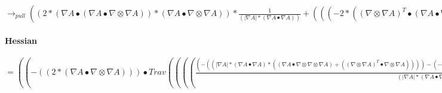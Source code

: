 \documentclass{article}
\begin{document}
\newline $\rightarrow_{pull}((2*( \nabla A \bullet ( \nabla A \bullet  \nabla  \otimes  \nabla A))*( \nabla A \bullet  \nabla  \otimes  \nabla A))* \frac{1}{(| \nabla A|*( \nabla A \bullet  \nabla A))}+(((-2*(( \nabla  \otimes  \nabla A)^T \bullet ( \nabla A \bullet  \nabla  \otimes  \nabla A)))+(-2*( \nabla A \bullet ( \nabla A \bullet  \nabla  \otimes  \nabla  \otimes  \nabla A))))+(-2*( \nabla A \bullet (( \nabla  \otimes  \nabla A)^T \bullet  \nabla  \otimes  \nabla A))))* \frac{1}{| \nabla A|})$

\paragraph{Hessian}
$= ((-((2*( \nabla A \bullet  \nabla  \otimes  \nabla A))) \bullet Trav(((( \frac{(-((| \nabla A|*( \nabla A \bullet  \nabla A)*(( \nabla A \bullet  \nabla  \otimes  \nabla  \otimes  \nabla A)+(( \nabla  \otimes  \nabla A)^T \bullet  \nabla  \otimes  \nabla A))))-(-(((((2*| \nabla A|*( \nabla A \bullet  \nabla  \otimes  \nabla A))+(( \nabla A \bullet  \nabla A)* \frac{( \nabla A \bullet  \nabla  \otimes  \nabla A)}{| \nabla A|}))*( \nabla A \bullet  \nabla  \otimes  \nabla A)))))^T)}{(| \nabla A|*( \nabla A \bullet  \nabla A)*| \nabla A|*( \nabla A \bullet  \nabla A))}* \nabla A))+Trav((( \nabla  \otimes  \nabla A* \frac{-((( \nabla A \bullet  \nabla  \otimes  \nabla A)))}{(| \nabla A|*( \nabla A \bullet  \nabla A))})))<2,:,0>+Trav(( \frac{1}{| \nabla A|}* \nabla  \otimes  \nabla  \otimes  \nabla A))<1,2,0>+Trav((( \frac{-((( \nabla A \bullet  \nabla  \otimes  \nabla A)))}{(| \nabla A|*( \nabla A \bullet  \nabla A))}* \nabla  \otimes  \nabla A)))<2,0,1>))<1,2,0>)+(((( \frac{-((( \nabla A \bullet  \nabla  \otimes  \nabla A)))}{(| \nabla A|*( \nabla A \bullet  \nabla A))}* \nabla A))+(( \frac{1}{| \nabla A|}* \nabla  \otimes  \nabla A))^T) \bullet (-((2*((( \nabla A \bullet  \nabla  \otimes  \nabla  \otimes  \nabla A))^T+((( \nabla  \otimes  \nabla A)^T \bullet  \nabla  \otimes  \nabla A))^T))))^T)+( \nabla A \bullet Trav((( \frac{1}{| \nabla A|}*-((2*(Trav(( \nabla A \bullet  \nabla  \otimes  \nabla  \otimes  \nabla  \otimes  \nabla A))<1,2,0>+Trav((Trav( \nabla  \otimes  \nabla  \otimes  \nabla A)<2,1,0> \bullet  \nabla  \otimes  \nabla A))<1,2,0>+Trav((( \nabla  \otimes  \nabla A)^T \bullet  \nabla  \otimes  \nabla  \otimes  \nabla A))<1,2,0>+Trav((( \nabla  \otimes  \nabla A)^T \bullet  \nabla  \otimes  \nabla  \otimes  \nabla A))<:,2,1>))))+Trav((( \frac{-((( \nabla A \bullet  \nabla  \otimes  \nabla A)))}{(| \nabla A|*( \nabla A \bullet  \nabla A))}*-((2*((( \nabla A \bullet  \nabla  \otimes  \nabla  \otimes  \nabla A))^T+((( \nabla  \otimes  \nabla A)^T \bullet  \nabla  \otimes  \nabla A))^T))))))<1,0,:>))<1,2,0>)+( \frac{1}{| \nabla A|}*(-((2*((( \nabla A \bullet  \nabla  \otimes  \nabla  \otimes  \nabla A))^T+((( \nabla  \otimes  \nabla A)^T \bullet  \nabla  \otimes  \nabla A))^T))) \bullet  \nabla  \otimes  \nabla A)))$
\end{document}
